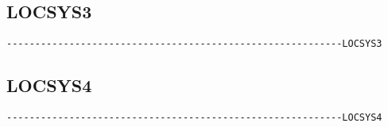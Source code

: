 

\subsection{LOCSYS3}
\begin{verbatim}
-----------------------------------------------------------LOCSYS3
\end{verbatim}




\subsection{LOCSYS4}
\begin{verbatim}
-----------------------------------------------------------LOCSYS4
\end{verbatim}


